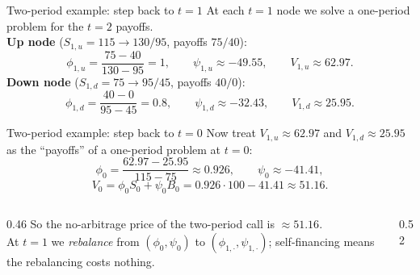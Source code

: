 \documentclass[pdf, handout]{beamer}
\begin{document}
\begin{frame}{Two-period example: step back to $t=1$}
At each $t=1$ node we solve a one-period problem for the $t=2$ payoffs.
\\[2pt]
\textbf{Up node} ($S_{1,u}=115\to 130/95$, payoffs $75/40$):
\[
\phi_{1,u}=\frac{75-40}{130-95}=1,\qquad \psi_{1,u}\approx-49.55,\qquad
V_{1,u}\approx 62.97 .
\]
\textbf{Down node} ($S_{1,d}=75\to 95/45$, payoffs $40/0$):
\[
\phi_{1,d}=\frac{40-0}{95-45}=0.8,\qquad \psi_{1,d}\approx-32.43,\qquad
V_{1,d}\approx 25.95 .
\]
\end{frame}

\begin{frame}{Two-period example: step back to $t=0$}
Now treat $V_{1,u}\approx 62.97$ and $V_{1,d}\approx 25.95$ as the ``payoffs'' of a one-period problem at $t=0$:
\[
\phi_0=\frac{62.97-25.95}{115-75}\approx 0.926,\qquad \psi_0\approx-41.41,
\]
\[
V_0=\phi_0 S_0+\psi_0 B_0=0.926\cdot100-41.41\approx 51.16 .
\]
\begin{columns}[c]
\begin{column}{0.46\textwidth}
\footnotesize
So the no-arbitrage price of the two-period call is $\approx 51.16$.\\[3pt]
At $t=1$ we \emph{rebalance} from $(\phi_0,\psi_0)$ to $(\phi_{1,\cdot},\psi_{1,\cdot})$; self-financing means the rebalancing costs nothing.
\end{column}
\begin{column}{0.52\textwidth}
\centering
{}
\end{column}
\end{columns}
\end{frame}
\end{document}

